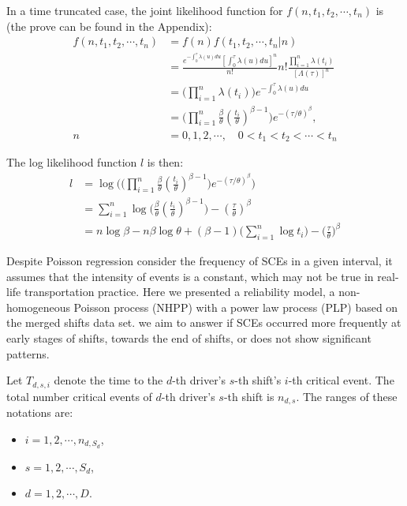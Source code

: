\documentclass[12pt]{book}
\numberwithin{equation}{chapter}
\providecommand{\tightlist}{%
  \setlength{\itemsep}{0pt}\setlength{\parskip}{0pt}}
\begin{document}
In a time truncated case, the joint likelihood function for \(f(n, t_1, t_2, \cdots, t_n)\) is (the prove can be found in the Appendix):
\begin{equation}\label{pdftau}
\begin{aligned}
f(n, t_1, t_2, \cdots, t_n) & = f(n)f(t_1, t_2, \cdots, t_n|n)\\
& = \frac{e^{-\int_0^\tau \lambda(u)du}[\int_0^\tau \lambda(u)du]^n}{n!}n!\frac{\prod_{i=1}^n\lambda(t_i)}{[\Lambda(\tau)]^n}\\
& = \Big(\prod_{i=1}^n\lambda(t_i) \Big)e^{-\int_0^\tau \lambda(u)du}\\
& = \Big(\prod_{i=1}^n\frac{\beta}{\theta}(\frac{t_i}{\theta})^{\beta - 1} \Big)e^{-(\tau/\theta)^\beta},\\ 
n & = 0, 1, 2, \cdots, \quad  0 < t_1 < t_2 < \cdots < t_n
\end{aligned}
\end{equation}

The log likelihood function \(l\) is then:
\begin{equation}\label{logtau}
\begin{aligned}
l & = \log \Bigg(\Big(\prod_{i=1}^n\frac{\beta}{\theta}(\frac{t_i}{\theta})^{\beta - 1}\Big)e^{-(\tau/\theta)^\beta}\Bigg)\\
& = \sum_{i=1}^n\log\Big(\frac{\beta}{\theta}(\frac{t_i}{\theta})^{\beta - 1}\Big) - (\frac{\tau}{\theta})^\beta\\
& = n\log\beta - n\beta\log\theta + (\beta - 1)\bigg(\sum_{i=1}^n\log t_i\bigg) - \Big(\frac{\tau}{\theta}\Big)^\beta
\end{aligned}
\end{equation}

Despite Poisson regression consider the frequency of SCEs in a given interval, it assumes that the intensity of events is a constant, which may not be true in real-life transportation practice. Here we presented a reliability model, a non-homogeneous Poisson process (NHPP) with a power law process (PLP) based on the merged shifts data set. we aim to answer if SCEs occurred more frequently at early stages of shifts, towards the end of shifts, or does not show significant patterns.

Let \(T_{d, s, i}\) denote the time to the \(d\)-th driver's \(s\)-th shift's \(i\)-th critical event. The total number critical events of \(d\)-th driver's \(s\)-th shift is \(n_{d,s}\). The ranges of these notations are:

\begin{itemize}
\tightlist
\item
  \(i = 1, 2, \cdots, n_{d, S_d}\),
\item
  \(s = 1, 2, \cdots, S_d\),
\item
  \(d = 1, 2, \cdots, D\).
\end{itemize}
\end{document}

